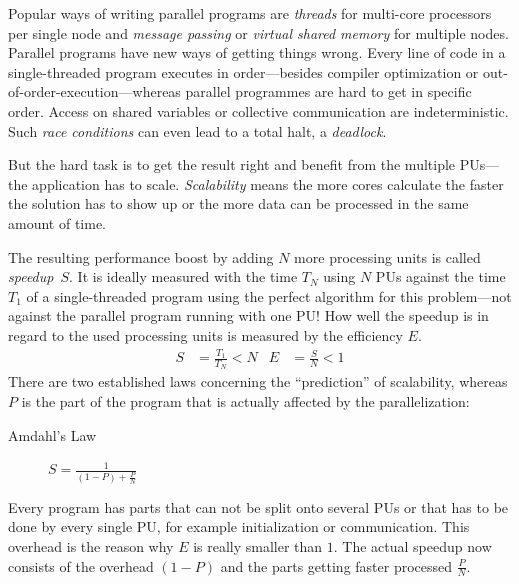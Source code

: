 Popular ways of writing parallel programs are \emph{threads} for multi-core processors per single node and \emph{message passing} or \emph{virtual shared memory} for multiple nodes. Parallel programs have new ways of getting things wrong. Every line of code in a single-threaded program executes in order---besides compiler optimization or out-of-order-execution---whereas parallel programmes are hard to get in specific order. Access on shared variables or collective communication are indeterministic. Such \emph{race conditions} can even lead to a total halt, a \emph{deadlock}.

But the hard task is to get the result right and benefit from the multiple PUs---the application has to scale. \emph{Scalability} means the more cores calculate the faster the solution has to show up or the more data can be processed in the same amount of time.

The resulting performance boost by adding $N$ more processing units is called \emph{speedup}~$S$. It is ideally measured with the time $T_N$ using $N$ PUs against the time $T_1$ of a single-threaded program using the perfect algorithm for this problem---not against the parallel program running with one PU! How well the speedup is in regard to the used processing units is measured by the efficiency $E$\cite{ludwig}.
%
\begin{align*}
S &= \frac{T_{1}}{T_{N}}<N & E &= \frac{S}{N}<1
\end{align*}
%
There are two established laws concerning the ``prediction'' of scalability, whereas $P$ is the part of the program that is actually affected by the parallelization:
%
\begin{description}
\item[Amdahl's Law] $S = \frac{1}{(1-P) + \frac{P}{N}}$
\end{description}
%
Every program has parts that can not be split onto several PUs or that has to be done by every single PU, for example initialization or communication. This overhead is the reason why $E$ is really smaller than $1$.
The actual speedup now consists of the overhead $(1-P)$ and the parts getting faster processed $\frac{P}{N}$.

